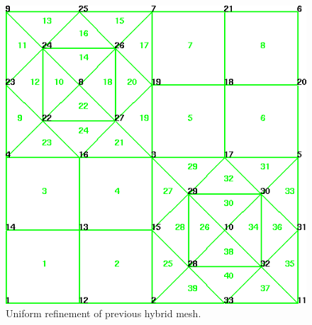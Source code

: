 \documentclass[12pt]{article}
\begin{document}
\clearpage
\begin{figure}
  \centerline{\includegraphics[width=.9\textwidth]{refined_hybrid_mesh}}
  \caption{Uniform refinement of previous hybrid mesh.}
\end{figure}
\end{document}
